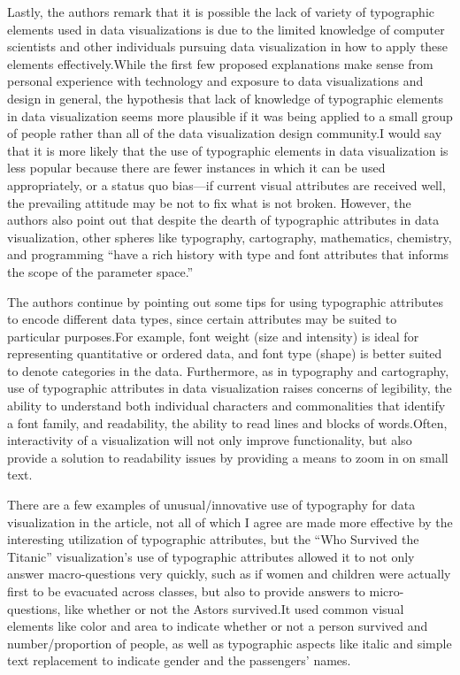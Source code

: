 \documentclass[]{book}
\theoremstyle{definition}
\theoremstyle{definition}
\theoremstyle{definition}
\theoremstyle{remark}
\begin{document}
Lastly, the authors remark that it is possible the lack of variety of
typographic elements used in data visualizations is due to the limited
knowledge of computer scientists and other individuals pursuing data
visualization in how to apply these elements effectively.While the first
few proposed explanations make sense from personal experience with
technology and exposure to data visualizations and design in general,
the hypothesis that lack of knowledge of typographic elements in data
visualization seems more plausible if it was being applied to a small
group of people rather than all of the data visualization design
community.I would say that it is more likely that the use of typographic
elements in data visualization is less popular because there are fewer
instances in which it can be used appropriately, or a status quo
bias---if current visual attributes are received well, the prevailing
attitude may be not to fix what is not broken. However, the authors also
point out that despite the dearth of typographic attributes in data
visualization, other spheres like typography, cartography, mathematics,
chemistry, and programming ``have a rich history with type and font
attributes that informs the scope of the parameter space.''

The authors continue by pointing out some tips for using typographic
attributes to encode different data types, since certain attributes may
be suited to particular purposes.For example, font weight (size and
intensity) is ideal for representing quantitative or ordered data, and
font type (shape) is better suited to denote categories in the data.
Furthermore, as in typography and cartography, use of typographic
attributes in data visualization raises concerns of legibility, the
ability to understand both individual characters and commonalities that
identify a font family, and readability, the ability to read lines and
blocks of words.Often, interactivity of a visualization will not only
improve functionality, but also provide a solution to readability issues
by providing a means to zoom in on small text.

There are a few examples of unusual/innovative use of typography for
data visualization in the article, not all of which I agree are made
more effective by the interesting utilization of typographic attributes,
but the ``Who Survived the Titanic'' visualization's use of typographic
attributes allowed it to not only answer macro-questions very quickly,
such as if women and children were actually first to be evacuated across
classes, but also to provide answers to micro-questions, like whether or
not the Astors survived.It used common visual elements like color and
area to indicate whether or not a person survived and number/proportion
of people, as well as typographic aspects like italic and simple text
replacement to indicate gender and the passengers' names.
\end{document}
